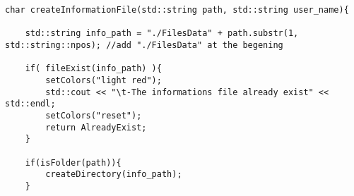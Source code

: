 \begin{lstlisting}
char createInformationFile(std::string path, std::string user_name){

    std::string info_path = "./FilesData" + path.substr(1, std::string::npos); //add "./FilesData" at the begening

    if( fileExist(info_path) ){
        setColors("light red");
        std::cout << "\t-The informations file already exist" << std::endl;
        setColors("reset");
        return AlreadyExist;
    }

    if(isFolder(path)){
        createDirectory(info_path);
    }
\end{lstlisting}
